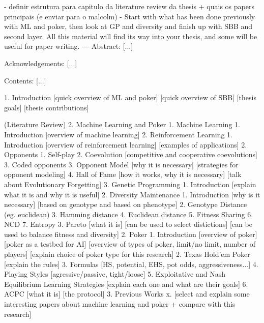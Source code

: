 - definir estrutura para capitulo da literature review da thesis + quais os papers principais (e enviar para o malcolm)
    - Start with what has been done previously with ML and poker, then look at GP and diversity and finish up with SBB and second layer. All this material will find its way into your thesis, and some will be useful for paper writing.
---
Abstract:
[...]

Acknowledgements:
[...]

Contents:
[...]

1. Introduction
    [quick overview of ML and poker]
    [quick overview of SBB]
    [thesis goals]
    [thesis contributions]

(Literature Review)
2. Machine Learning and Poker
    1. Machine Learning
        1. Introduction
            [overview of machine learning]
        2. Reinforcement Learning
            1. Introduction
                [overview of reinforcement learning]
                [examples of applications]
            2. Opponents
                1. Self-play
                2. Coevolution
                    [competitive and cooperative coevolutions]
                3. Coded opponents
            3. Opponent Model
                [why it is necessary]
                [strategies for opponent modeling]
            4. Hall of Fame
                [how it works, why it is necessary]
                [talk about Evolutionary Forgetting]
        3. Genetic Programming
            1. Introduction
                [explain what it is and why it is useful]
            2. Diversity Maintenance
                1. Introduction
                    [why is it necessary]
                    [based on genotype and based on phenotype]
                2. Genotype Distance (eg. euclidean) 
                3. Hamming distance
                4. Euclidean distance
                5. Fitness Sharing
                6. NCD
                7. Entropy
            3. Pareto
                [what it is]
                [can be used to select distictions]
                [can be used to balance fitness and diversity]
    2. Poker
        1. Introduction
            [overview of poker]
            [poker as a testbed for AI]
            [overview of types of poker, limit/no limit, number of players]
            [explain choice of poker type for this research]
        2. Texas Hold’em Poker
            [explain the rules]
        3. Formulas
            [HS, potential, EHS, pot odds, aggressiveness...]
        4. Playing Styles
            [agressive/passive, tight/loose]
        5. Exploitative and Nash Equilibrium Learning Strategies
            [explain each one and what are their goals]
        6. ACPC
            [what it is]
            [the protocol]
    3. Previous Works
        x. [select and explain some interesting papers about machine learning and poker + compare with this research]

